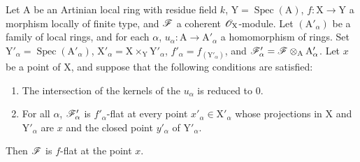 \begin{proposition}[11.4.12]
\label{IV.11.4.12}
Let $\mathrm{A}$ be an Artinian local ring with residue field $k$,
$\mathrm{Y}=\operatorname{Spec}(\mathrm{A})$, $f:\mathrm{X}\to\mathrm{Y}$ a morphism locally of finite type, and $\mathscr{F}$ a coherent $\mathscr{O}_\mathrm{X}$-module.
Let $(\mathrm{A}'_\alpha)$ be a family of local rings, and for each $\alpha$, $u_\alpha:\mathrm{A}\to\mathrm{A}'_\alpha$ a homomorphism
of rings. Set $\mathrm{Y}'_\alpha=\operatorname{Spec}(\mathrm{A}'_\alpha)$, $\mathrm{X}'_\alpha=\mathrm{X}\times_\mathrm{Y}\mathrm{Y}'_\alpha$,
$f'_\alpha=f_{(\mathrm{Y}'_\alpha)}$, and $\mathscr{F}'_\alpha=\mathscr{F}\otimes_\mathrm{A}\mathrm{A}'_\alpha$. Let $x$ be a point
of $\mathrm{X}$, and suppose that the following conditions are satisfied:
\begin{enumerate}[label=(\roman*)]
  \item The intersection of the kernels of the $u_\alpha$ is reduced to $0$.
  \item For all $\alpha$, $\mathscr{F}'_\alpha$ is $f'_\alpha$-flat at every point $x'_\alpha\in\mathrm{X}'_\alpha$ whose projections in $\mathrm{X}$ and $\mathrm{Y}'_\alpha$
  are $x$ and the closed point $y'_\alpha$ of $\mathrm{Y}'_\alpha$.
\end{enumerate}

Then $\mathscr{F}$ is $f$-flat at the point $x$.
\end{proposition}

